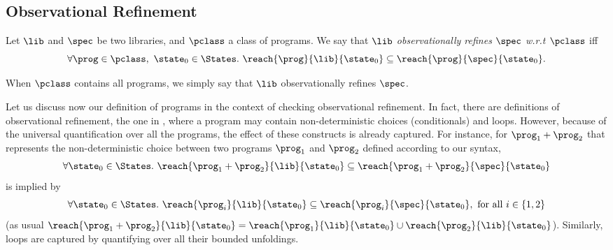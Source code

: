 

 


\subsection{Observational Refinement}\label{sec:obs_ref}

\begin{definition}
Let $\lib$ and $\spec$ be two libraries, and $\pclass$ a class of programs. %
We say that \emph{$\lib$ observationally refines $\spec$ w.r.t $\pclass$} iff
\[
\forall \prog\in\pclass,\ \state_0\in\States.\ \reach{\prog}{\lib}{\state_0}\subseteq \reach{\prog}{\spec}{\state_0}.
\]

When $\pclass$ contains all programs, we simply say that $\lib$ observationally refines $\spec$.
\end{definition}

Let us discuss now our definition of programs in the context of checking observational refinement. In fact, there are definitions of observational refinement, \eg the one in \citet{journals/tcs/FilipovicORY10}, where a program may contain non-deterministic choices (conditionals) and loops. 
However, because of the universal quantification over all the programs, the effect of these constructs is already captured.
For instance, for $\prog_1+\prog_2$ that represents the non-deterministic choice between two programs 
$\prog_1$ and $\prog_2$ defined according to our syntax, 
\[
\forall\state_0\in\States.\ \reach{\prog_1+\prog_2}{\lib}{\state_0}\subseteq \reach{\prog_1+\prog_2}{\spec}{\state_0}
\]
is implied by 
\[
\forall \state_0\in\States.\ \reach{\prog_i}{\lib}{\state_0}\subseteq \reach{\prog_i}{\spec}{\state_0},\mbox{ for all $i\in\{1,2\}$}
\]
(as usual $\reach{\prog_1+\prog_2}{\lib}{\state_0}=\reach{\prog_1}{\lib}{\state_0}\cup \reach{\prog_2}{\lib}{\state_0}$).
%
Similarly, loops are captured by quantifying over all their bounded unfoldings. 

